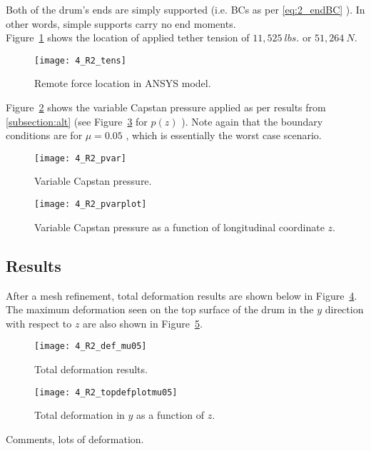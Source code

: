 Both of the drum's ends are simply supported (i.e. BCs as per \ref{eq:2_endBC} ). In other words, simple supports carry no end moments.\\

Figure~\ref{fig:4_R2_tens} shows the location of applied tether tension of $11,525\ lbs.$ or $51,264\ N$.
\begin{figure}[H]
	\centering
	\texttt{[image: 4\_R2\_tens]}
	\caption{Remote force location in ANSYS model.}
	\label{fig:4_R2_tens}
\end{figure}

Figure~\ref{fig:4_R2_pvar} shows the variable Capstan pressure applied as per results from \ref{subsection:alt} (see Figure~\ref{fig:4_R2_pvarplot} for $p(z)$ ). Note again that the boundary conditions are for $\mu=0.05$ , which is essentially the worst case scenario.

\begin{figure}[H]
	\centering
	\texttt{[image: 4\_R2\_pvar]}
	\caption{Variable Capstan pressure.}
	\label{fig:4_R2_pvar}
\end{figure}
\begin{figure}[H]
	\centering
	\texttt{[image: 4\_R2\_pvarplot]}
	\caption{Variable Capstan pressure as a function of longitudinal coordinate $z$.}
	\label{fig:4_R2_pvarplot}
\end{figure}


\subsection{Results}

After a mesh refinement, total deformation results are shown below in Figure~\ref{fig:4_R2_def_mu05}. The maximum deformation seen on the top surface of the drum in the $y$ direction with respect to $z$ are also shown in Figure~\ref{fig:4_R2_topdefplotmu05}.

\begin{figure}[H]
	\centering
	\texttt{[image: 4\_R2\_def\_mu05]}
	\caption{Total deformation results.}
	\label{fig:4_R2_def_mu05}
\end{figure}
\begin{figure}[H]
	\centering
	\texttt{[image: 4\_R2\_topdefplotmu05]}
	\caption{Total deformation in $y$ as a function of $z$.}
	\label{fig:4_R2_topdefplotmu05}
\end{figure}

Comments, lots of deformation.\\

